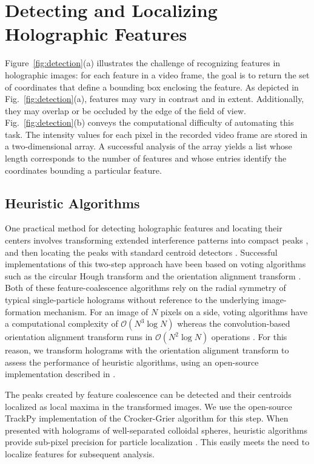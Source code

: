 \section{Detecting and Localizing Holographic Features}

Figure~\ref{fig:detection}(a) illustrates the challenge of
recognizing features in holographic images: for each
feature in a video frame, the goal is to return the set of coordinates
that define a bounding box enclosing the feature. As depicted
in Fig.~\ref{fig:detection}(a), features may vary in
contrast and in extent. Additionally, they may overlap or be occluded by
the edge of the field of view. Fig.~\ref{fig:detection}(b) conveys the computational
difficulty of automating this task. The intensity values
for each pixel in the recorded video frame are stored in a two-dimensional
array. A successful analysis of the
array yields a list whose length corresponds to the number of features and whose
entries identify the coordinates bounding a particular feature.
  
\subsection{ Heuristic Algorithms}
\label{sec:heuristic}

One practical method for detecting holographic features and 
locating their centers involves transforming extended interference
patterns into compact peaks \cite{cheong09,krishnatreya14a}, and 
then locating the peaks with standard centroid detectors 
\cite{crocker96,allan16trackpy}. 
Successful implementations of this two-step
approach have been based on
voting algorithms such as the circular Hough transform
\cite{cheong09,parthasarathy12,allan16trackpy} and
the orientation alignment transform \cite{krishnatreya14a}.
Both of these feature-coalescence algorithms rely on the
radial symmetry of typical single-particle holograms
without reference to the underlying image-formation
mechanism.
For an image of $N$ pixels on a side, voting algorithms
have a computational complexity of $\mathcal{O}\left (N^3 \log N \right )$ 
\cite{hollitt13} whereas the convolution-based orientation alignment
transform
runs in $\mathcal{O}\left ( N^2 \log N \right )$ operations \cite{cheong09}.
For this reason, we transform holograms with the
orientation alignment transform
to assess the performance of heuristic algorithms,
using an open-source implementation described
in \cite{cheong09}.

The peaks created by feature coalescence can be detected
and their centroids localized as local maxima in the transformed images.
We use the open-source
TrackPy implementation \cite{allan16trackpy}
of the Crocker-Grier algorithm \cite{crocker96} for this step.
When presented with holograms of well-separated
colloidal spheres, heuristic algorithms provide
sub-pixel precision for particle localization
\cite{cheong09,krishnatreya14a}.
This easily meets the need to localize
features for subsequent analysis.

